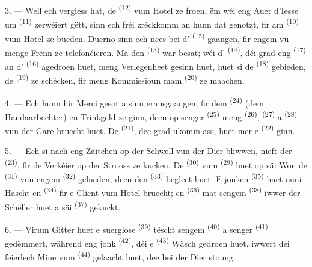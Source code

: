 3. --- Well ech vergiess hat, de  \textsuperscript{(12)} vum Hotel ze
froen, ëm wéi eng Auer d'Iesse um  \textsuperscript{(11)}
zerwéiert gëtt, sinn ech fréi zréckkomm an hunn dat genotzt, fir am
 \textsuperscript{(10)} vum Hotel ze bueden. Duerno sinn ech nees
bei d' \textsuperscript{(15)} gaangen, fir engem vu menge Frënn ze
telefonéieren. Mä den  \textsuperscript{(13)} war besat; wéi
d' \textsuperscript{(14)}, déi grad eng 
\textsuperscript{(17)} an d' \textsuperscript{(16)}
agedroen huet, meng Verlegenheet gesinn huet, huet si de 
\textsuperscript{(18)} gebieden, de  \textsuperscript{(19)} ze
schécken, fir meng Kommissioun mam  \textsuperscript{(20)} ze maachen.

4. --- Ech hunn hir Merci gesot a sinn erausgaangen, fir dem 
\textsuperscript{(24)} (dem Handaarbechter) en Trinkgeld ze ginn, deen op senger
 \textsuperscript{(25)} meng 
\textsuperscript{(26)},  \textsuperscript{(27)} a  \textsuperscript{(28)} vun der Gare bruecht huet. De
 \textsuperscript{(21)}, dee grad ukomm ass, huet mer e
 \textsuperscript{(22)} ginn.

5. --- Ech si nach eng Zäitchen op der Schwell vun der Dier bliwwen, nieft der
 \textsuperscript{(23)}, fir de Verkéier op der Strooss ze kucken.
De  \textsuperscript{(30)} vum 
\textsuperscript{(29)} huet op säi Won de  \textsuperscript{(31)} vun
engem  \textsuperscript{(32)} gelueden, deen den
 \textsuperscript{(33)} begleet huet. E jonken 
\textsuperscript{(35)} huet ouni Hascht en  \textsuperscript{(34)}
fir e Client vum Hotel bruecht; en  \textsuperscript{(36)} mat sengem
 \textsuperscript{(38)} iwwer der Schëller huet a säi
 \textsuperscript{(37)} gekuckt.

\VUsaut{4.0mm}
\VUsaut{3.0mm}

6. --- Virum Gitter huet e suerglose  \textsuperscript{(39)}
tëscht sengem  \textsuperscript{(40)} a senger
 \textsuperscript{(41)} gedëmmert, während eng jonk
 \textsuperscript{(42)}, déi e  \textsuperscript{(43)}
Wäsch gedroen huet, iwwert déi feierlech Mine vum 
\textsuperscript{(44)} gelaacht huet, dee bei der Dier stoung.

